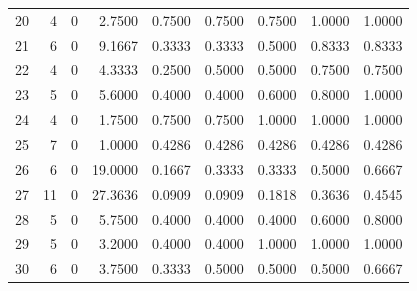\begin{table}[htbp]
{\begin{tabular}{r r r r r r r r r}
    20 & 4 & 0 & 2.7500 & 0.7500 & 0.7500 & 0.7500 & 1.0000 & 1.0000 \\
    21 & 6 & 0 & 9.1667 & 0.3333 & 0.3333 & 0.5000 & 0.8333 & 0.8333 \\
    22 & 4 & 0 & 4.3333 & 0.2500 & 0.5000 & 0.5000 & 0.7500 & 0.7500 \\
    23 & 5 & 0 & 5.6000 & 0.4000 & 0.4000 & 0.6000 & 0.8000 & 1.0000 \\
    24 & 4 & 0 & 1.7500 & 0.7500 & 0.7500 & 1.0000 & 1.0000 & 1.0000 \\
    25 & 7 & 0 & 1.0000 & 0.4286 & 0.4286 & 0.4286 & 0.4286 & 0.4286 \\
    26 & 6 & 0 & 19.0000 & 0.1667 & 0.3333 & 0.3333 & 0.5000 & 0.6667 \\
    27 & 11 & 0 & 27.3636 & 0.0909 & 0.0909 & 0.1818 & 0.3636 & 0.4545 \\
    28 & 5 & 0 & 5.7500 & 0.4000 & 0.4000 & 0.4000 & 0.6000 & 0.8000 \\
    29 & 5 & 0 & 3.2000 & 0.4000 & 0.4000 & 1.0000 & 1.0000 & 1.0000 \\
    30 & 6 & 0 & 3.7500 & 0.3333 & 0.5000 & 0.5000 & 0.5000 & 0.6667 \\
    \bottomrule
    \end{tabular}
    }
    \end{table}
    
    
    

